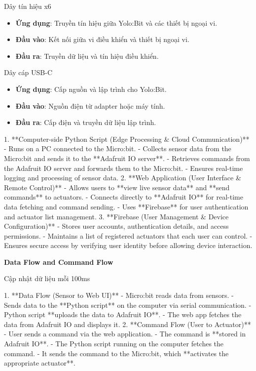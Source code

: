 Dây tín hiệu x6
\begin{itemize}
    \item \textbf{Ứng dụng}: Truyền tín hiệu giữa Yolo:Bit và các thiết bị ngoại vi.
    \item \textbf{Đầu vào}: Kết nối giữa vi điều khiển và thiết bị ngoại vi.
    \item \textbf{Đầu ra}: Truyền dữ liệu và tín hiệu điều khiển.
\end{itemize}

Dây cáp USB-C
\begin{itemize}
    \item \textbf{Ứng dụng}: Cấp nguồn và lập trình cho Yolo:Bit.
    \item \textbf{Đầu vào}: Nguồn điện từ adapter hoặc máy tính.
    \item \textbf{Đầu ra}: Cấp điện và truyền dữ liệu lập trình.
\end{itemize}

1. **Computer-side Python Script (Edge Processing \&     Cloud Communication)**
- Runs on a PC connected to the Micro:bit.
- Collects sensor data from the Micro:bit and sends it      to the **Adafruit IO server**.
- Retrieves commands from the Adafruit IO server and      forwards them to the Micro:bit.
- Ensures real-time logging and processing of sensor data.
2. **Web Application (User Interface \& Remote Control)**
- Allows users to **view live sensor data** and **send      commands** to actuators.
- Connects directly to **Adafruit IO** for real-time      data fetching and command sending.
- Uses **Firebase** for user authentication and      actuator list management.
3. **Firebase (User Management \& Device Configuration)**
- Stores user accounts, authentication details, and      access permissions.
- Maintains a list of registered actuators that each      user can control.
- Ensures secure access by verifying user identity      before allowing device interaction.

\textbf{Data Flow and Command Flow}

Cập nhật dữ liệu mỗi 100ms

1. **Data Flow (Sensor to Web UI)**
- Micro:bit reads data from sensors.
- Sends data to the **Python script** on the computer      via serial communication.
- Python script **uploads the data to Adafruit IO**.
- The web app fetches the data from Adafruit IO and      displays it.
2. **Command Flow (User to Actuator)**
- User sends a command via the web application.
- The command is **stored in Adafruit IO**.
- The Python script running on the computer fetches the      command.
- It sends the command to the Micro:bit, which **activates      the appropriate actuator**.




